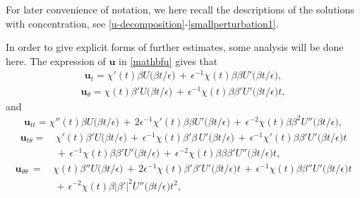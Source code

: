 \documentclass[10pt, reqno]{amsart}
\numberwithin{equation}{section}
\theoremstyle{definition}
\begin{document}
{{ For later convenience of notation, we here recall the descriptions of the solutions with concentration,
 see \eqref{u-decomposition}-\eqref{smallperturbation1}.

\medskip
 In order to give explicit forms of further estimates, some analysis will be done here.
 The expression of ${\mathbf u}$ in \eqref{mathbfu} gives that
\begin{align}
 {\mathbf u}_t =\chi'(t)\beta U\big(\beta t/\epsilon\big)
 \,+\,
 \epsilon^{-1}\chi(t)\beta\beta U'\big(\beta t/\epsilon\big),
 \label{mathbfu-t}
\end{align}
\begin{align}
 {\mathbf u}_{\theta} = \chi(t)\beta' U\big(\beta t/\epsilon\big)
 \,+\,
 \epsilon^{-1} \chi(t)\beta \beta' U'\big(\beta t/\epsilon\big)t,
 \label{mathbfu-theta}
\end{align}
 and
\begin{align}
 {\mathbf u}_{tt} = \chi''(t) \beta U\big(\beta t/\epsilon\big)
 \,+\,
 2\epsilon^{-1}\chi'(t)\beta\beta U'\big(\beta t/\epsilon\big)
 \,+\,
 \epsilon^{-2}\chi(t)\beta\beta^2 U''\big(\beta t/\epsilon\big),
 \label{mathbfu-tt}
\end{align}
\begin{align}
 {\mathbf u}_{t\theta} =&\,\chi'(t)\beta' U\big(\beta t/\epsilon\big)
 \,+\,\epsilon^{-1}\chi(t)\beta'\beta\, U'\big(\beta t/\epsilon\big)
 \,+\,\epsilon^{-1}\chi'(t)\beta \beta' U'\big(\beta t/\epsilon\big)t
\nonumber\\[2mm]
 &
 \,+\,\epsilon^{-1} \chi(t)\beta \beta' U'\big(\beta t/\epsilon\big)
 \,+\,\epsilon^{-2}\chi(t)\beta\beta \beta' U''\big(\beta t/\epsilon\big)t,
 \label{mathbfu-ttheta}
\end{align}
\begin{align}
 {\mathbf u}_{\theta\theta}
 \,=\,
 &\chi(t)\beta''U\big(\beta t/\epsilon\big)
 \,+\, 2 \epsilon^{-1}\chi(t)\beta'\beta' U'\big(\beta t/\epsilon\big)t
 \,+\, \epsilon^{-1}\chi(t)\beta\beta'' U'\big(\beta t/\epsilon\big)t
\nonumber\\[2mm]
 & \,+\, \epsilon^{-2}\chi(t)\beta|\beta'|^2 U''\big(\beta t/\epsilon\big)t^2,
 \label{mathbfu-thetatheta}
\end{align}
}}
\end{document}

